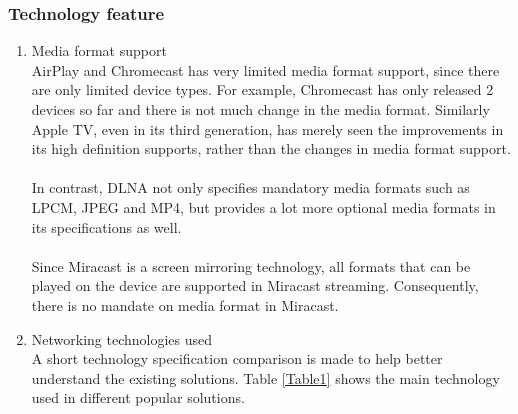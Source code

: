 \subsubsection{Technology feature} 
\begin{enumerate} 
\item Media format support \\ 
AirPlay and Chromecast has very limited media format support, since there are 
only limited device types. For example, Chromecast has only released 2 devices so far and there is not much change in the media format. Similarly Apple TV, even in its third generation,  has merely seen the improvements in its high definition supports, rather than the changes in media format support.  \\
\\
In contrast, DLNA not only specifies mandatory media formats such as LPCM, JPEG  and MP4, but provides a lot more optional media formats in its specifications as well. \\
\\
Since Miracast is a screen mirroring technology, all formats that can be played on the device are supported in Miracast streaming. Consequently, there is no mandate on media format in Miracast.  

\item Networking technologies used \\ 

A short technology specification comparison is made to help better understand
the existing solutions. Table \ref{Table1} shows the main technology used 
in different popular solutions. 
\begin{table}[htb] 
\caption{Comparison of used technologies\label{Table1}} 
\begin{center} 
\end{center} 
\end{table} 


\end{enumerate}
